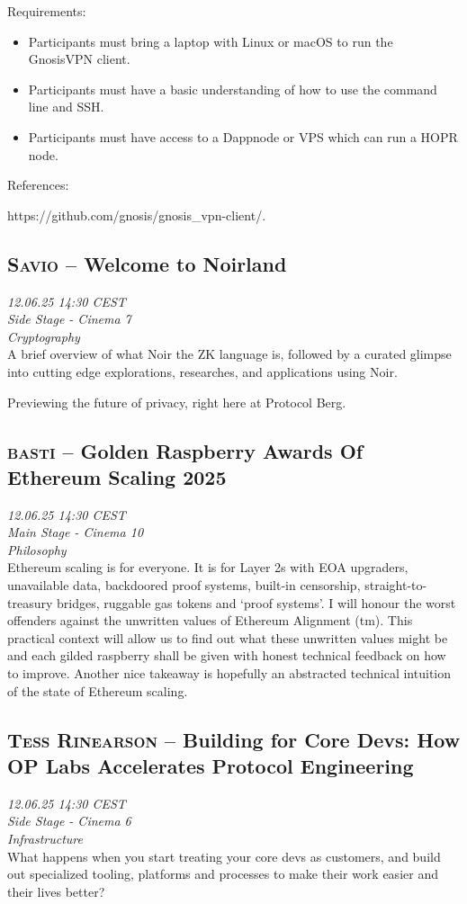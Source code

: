 Requirements:

\begin{itemize}
\item{} Participants must bring a laptop with Linux or macOS to run the GnosisVPN client.
\item{} Participants must have a basic understanding of how to use the command line and SSH.
\item{} Participants must have access to a Dappnode or VPS which can run a HOPR node.
\end{itemize}

References:

https://github.com/gnosis/gnosis\_vpn-client/.

\clearpage
\subsection {\textsc{Savio}  -- Welcome to Noirland} \noindent \textit {12.06.25 14:30 CEST\\ Side Stage - Cinema 7\\ Cryptography}\\[1em] A brief overview of what Noir the ZK language is, followed by a curated glimpse into cutting edge explorations, researches, and applications using Noir.

Previewing the future of privacy, right here at Protocol Berg.

\clearpage
\subsection {\textsc{basti}  -- Golden Raspberry Awards Of Ethereum Scaling 2025} \noindent \textit {12.06.25 14:30 CEST\\ Main Stage - Cinema 10\\ Philosophy}\\[1em] Ethereum scaling is for everyone. It is for Layer 2s with EOA upgraders, unavailable data, backdoored proof systems, built-in censorship, straight-to-treasury bridges, ruggable gas tokens and `proof systems'. I will honour the worst offenders against the unwritten values of Ethereum Alignment (tm). This practical context will allow us to find out what these unwritten values might be and each gilded raspberry shall be given with honest technical feedback on how to improve. Another nice takeaway is hopefully an abstracted technical intuition of the state of Ethereum scaling.

\clearpage
\subsection {\textsc{Tess Rinearson}  -- Building for Core Devs: How OP Labs Accelerates Protocol Engineering} \noindent \textit {12.06.25 14:30 CEST\\ Side Stage - Cinema 6\\ Infrastructure}\\[1em] What happens when you start treating your core devs as customers, and build out specialized tooling, platforms and processes to make their work easier and their lives better?


